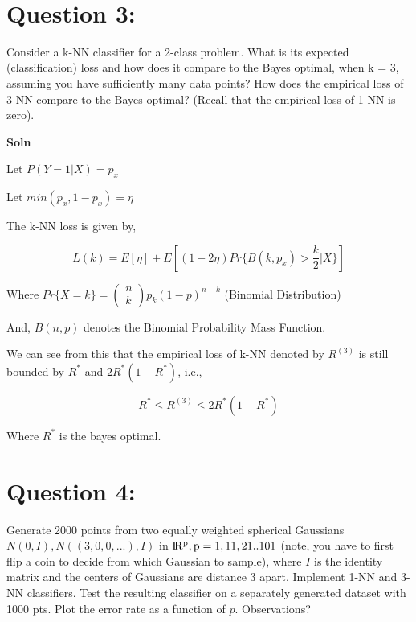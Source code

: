 \documentclass[11pt]{article}
\begin{document}
    \begin{center}
    \end{center}
    { \hspace*{\fill} \\}
    
\clearpage


    \hypertarget{question-3}{%
\section{Question 3:}\label{question-3}}

Consider a k-NN classifier for a 2-class problem. What is its expected
(classification) loss and how does it compare to the Bayes optimal, when
k = 3, assuming you have sufficiently many data points? How does the
empirical loss of 3-NN compare to the Bayes optimal? (Recall that the
empirical loss of 1-NN is zero).

\textbf{Soln}

Let \(P(Y=1 | X) = p_x\)

Let \(min(p_x, 1 - p_x) = \eta\)

The k-NN loss is given by,

\[L(k) = E[\eta] + E[(1 - 2 \eta)  Pr\{B(k, p_x)>\frac{k}{2} | X\}]\]

Where
\(Pr\{X = k\} = \left(\begin{array}{c}n\\ k\end{array}\right) p_k (1-p)^{n-k}\)
(Binomial Distribution)

And, \(B(n, p)\) denotes the Binomial Probability Mass Function.

We can see from this that the empirical loss of k-NN denoted by \(R^{(3)}\) is still
bounded by \(R^*\) and \(2R^*(1-R^*)\), i.e.,

\[R^* \leq R^{(3)} \leq 2R^*(1-R^*)\]

Where \(R^*\) is the bayes optimal.

\clearpage

    \hypertarget{question-4}{%
\section{Question 4:}\label{question-4}}

Generate 2000 points from two equally weighted spherical Gaussians
\(N(0, I), N((3, 0, 0, ...), I)\) in \( \rm I\!R^p, p =
1, 11, 21 .. 101 \) (note, you have to first flip a coin to decide from
which Gaussian to sample), where \(I\) is the identity matrix and the
centers of Gaussians are distance 3 apart. Implement 1-NN and 3-NN
classifiers. Test the resulting classifier on a separately generated
dataset with 1000 pts. Plot the error rate as a function of \(p\).
Observations?
\end{document}
